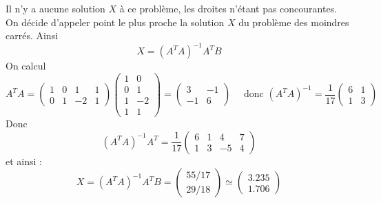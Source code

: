 \documentclass[class=report,crop=false]{standalone}
\begin{document}
\begin{exemple}
Il n'y a aucune solution $X$ à ce problème, les droites
n'étant pas concourantes. On décide d'appeler point \og le plus proche \fg{}
la solution $X$ du problème des moindres carrés.
Ainsi 
$$X = (A^TA)^{-1} A^T B$$
On calcul
$$A^TA  
= \begin{pmatrix}1&0&1&1\\0&1&-2&1\end{pmatrix}\begin{pmatrix}1&0\\0&1\\1&-2\\1&1\end{pmatrix}
= \begin{pmatrix}3&-1\\-1&6\end{pmatrix} \quad  \text{ donc }
(A^TA)^{-1} = \frac{1}{17} \begin{pmatrix}6&1\\1&3\end{pmatrix}$$
Donc 
$$(A^TA)^{-1} A^T = 
\frac{1}{17} \begin{pmatrix}6&1&4&7\\1&3&-5&4\end{pmatrix}$$
et ainsi :
$$X = (A^TA)^{-1} A^T B = \begin{pmatrix}55/17\\29/18\end{pmatrix}
\simeq \begin{pmatrix}\num{3.235}\\\num{1.706}\end{pmatrix}$$

  
\end{exemple}
\end{document}
